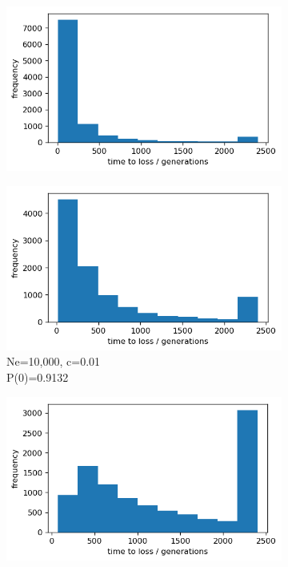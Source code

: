 \documentclass{article}
\begin{document}
\begin{figure}[h]
	\centering
	\begin{subfigure}[t]{0.24\linewidth}
		\centering
		\includegraphics[width = 1.0\linewidth, trim={0 0 0 0}, clip=true]{figures/Ne3400_c01_histloss.png}
	\end{subfigure}
	\hspace{0.0\linewidth}
	\begin{subfigure}[t]{0.24\linewidth}
		\centering
		\includegraphics[width = 1.0\linewidth, trim={0 0 0 0}, clip=true]{figures/Ne10000_c01_histloss.png}
		\caption{Ne=10,000, c=0.01\\P(0)=0.9132 }
	\end{subfigure}
	\hspace{0.0\linewidth}
	\begin{subfigure}[t]{0.24\linewidth}
		\centering
		\includegraphics[width = 1.0\linewidth, trim={0 0 0 0}, clip=true]{figures/Ne3400_c1_histloss.png}

\end{subfigure}
\end{figure}
\end{document}
